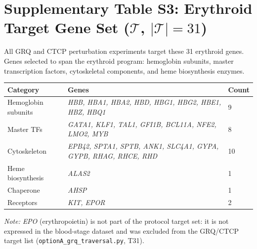 \documentclass[11pt,a4paper]{article}
\begin{document}
\section*{Supplementary Table S3: Erythroid Target Gene Set ($\mathcal{T}$, $|\mathcal{T}|=31$)}
\label{tab:s3_targets}

All GRQ and CTCP perturbation experiments target these 31 erythroid genes. Genes selected to span the erythroid program: hemoglobin subunits, master transcription factors, cytoskeletal components, and heme biosynthesis enzymes.

\vspace{0.5cm}
\begin{tabular}{lll}
\toprule
\textbf{Category} & \textbf{Genes} & \textbf{Count} \\
\midrule
Hemoglobin subunits & \textit{HBB, HBA1, HBA2, HBD, HBG1, HBG2, HBE1, HBZ, HBQ1} & 9 \\
Master TFs & \textit{GATA1, KLF1, TAL1, GFI1B, BCL11A, NFE2, LMO2, MYB} & 8 \\
Cytoskeleton & \textit{EPB42, SPTA1, SPTB, ANK1, SLC4A1, GYPA, GYPB, RHAG, RHCE, RHD} & 10 \\
Heme biosynthesis & \textit{ALAS2} & 1 \\
Chaperone & \textit{AHSP} & 1 \\
Receptors & \textit{KIT, EPOR} & 2 \\
\bottomrule
\end{tabular}

\vspace{0.5cm}
\textit{Note:} \textit{EPO} (erythropoietin) is not part of the protocol target set: it is not expressed in the blood-stage dataset and was excluded from the GRQ/CTCP target list (\texttt{optionA\_grq\_traversal.py}, T31).
\end{document}
